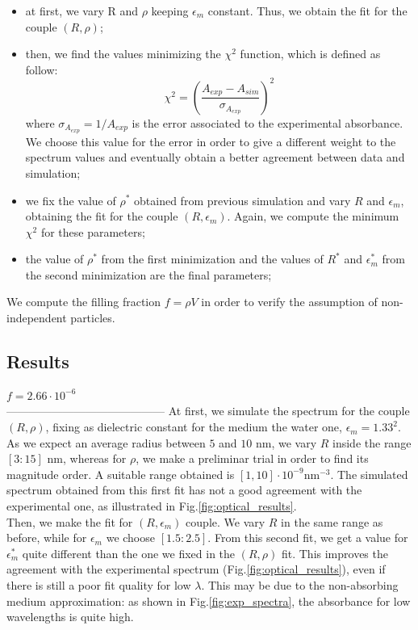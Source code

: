 \documentclass[twocolumn]{article}
\begin{document}
\begin{multicols}{2}
\begin{itemize}
    \item at first, we vary R and $\rho$ keeping $\epsilon_m$ constant. Thus, we obtain the fit for the couple $(R,\rho)$; 
    \item then, we find the values minimizing the $\chi^2$ function, which is defined as follow:
        \begin{equation}
        \chi^2 = (\frac{A_{exp}-A_{sim}}{\sigma_{A_{exp}}})^2
        \end{equation}
        where $\sigma_{A_{exp}} = 1/A_{exp} $ is the error associated to the experimental absorbance. We choose this value for the error in order to give a different weight to the spectrum values and eventually obtain a better agreement between data and simulation;
   \item we fix the value of $\rho^*$ obtained from previous simulation and vary $R$ and $\epsilon_m$, obtaining the fit for the couple $(R,\epsilon_m)$. Again, we compute the minimum $\chi^2$ for these parameters;
   \item the value of $\rho^*$ from the first minimization and the values of $R^*$ and $\epsilon_m^*$ from the second minimization are the final parameters;
\end{itemize}
We compute the filling fraction $f=\rho V$ in order to verify the assumption of non-independent particles.

\subsection{Results}

$f=2.66\cdot 10^{-6}$\\
------------------------------------------
At first, we simulate the spectrum for the couple $(R,\rho)$, fixing as dielectric constant for the medium the water one, $\epsilon_m = 1.33^2$. As we expect an average radius between $5$ and $10$ nm, we vary $R$ inside the range $[3:15]$ nm, whereas for $\rho$, we make a preliminar trial in order to find its magnitude order. A suitable range obtained is $[1,10]\cdot 10^{-9} \text{nm}^{-3}$. The simulated spectrum obtained from this first fit has not a good agreement with the experimental one, as illustrated in Fig.\ref{fig:optical_results}. \\
Then, we make the fit for $(R,\epsilon_m)$ couple. We vary $R$ in the same range as before, while for $\epsilon_m$ we choose $[1.5:2.5]$.
From this second fit, we get a value for $\epsilon_m^*$ quite different than the one we fixed in the $(R,\rho)$ fit. This improves the agreement with the experimental spectrum (Fig.\ref{fig:optical_results}), even if there is still a poor fit quality for low $\lambda$. This may be due to the non-absorbing medium approximation: as shown in Fig.\ref{fig:exp_spectra}, the absorbance for low wavelengths is quite high.


\end{multicols}
\end{document}

